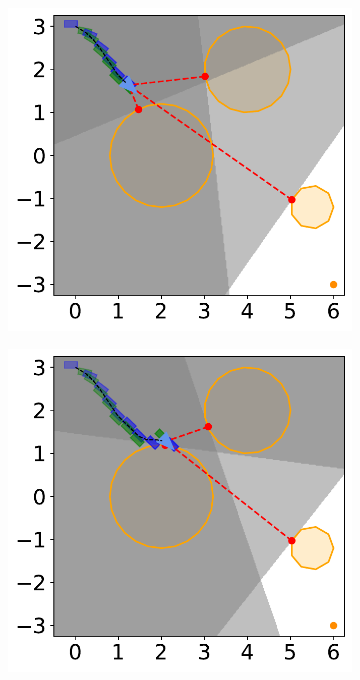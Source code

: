 \begin{figure}[H]
    \begin{subfigure}{0.35\textwidth}
        \centering
        \includegraphics[width=\textwidth]{figures/Simulations/sim1circles/frame_2.pdf}
    \end{subfigure}%
    \hfil
    \begin{subfigure}{0.35\textwidth}
        \centering
        \includegraphics[width=\textwidth]{figures/Simulations/sim1circles/frame_3.pdf}
    \end{subfigure}%


\end{figure}
